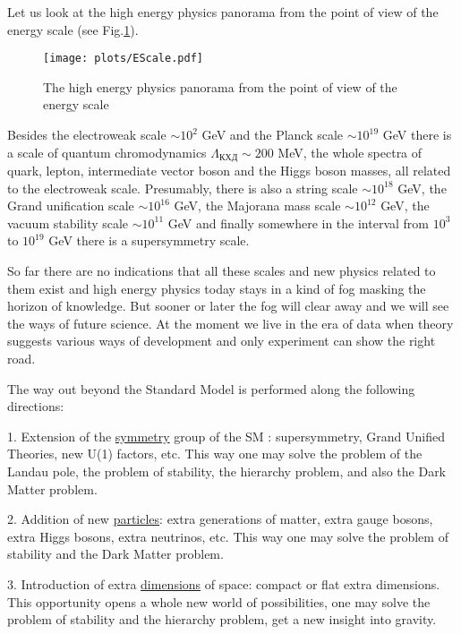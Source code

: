 \documentclass{cernyrep}
\begin{document}
Let us look at the high energy physics panorama from the point of view of the energy scale (see Fig.\ref{EScale}).
\begin{figure}[ht!]
\begin{center}\vspace{0.3cm}
\leavevmode
\texttt{[image: plots/EScale.pdf]}
\end{center}
\caption{The high energy physics panorama from the point of view of the energy scale}
\label{EScale}
\end{figure}
Besides the electroweak scale $\sim 10^2$  GeV and the Planck scale $\sim 10^{19}$  GeV there is a scale of quantum chromodynamics $\Lambda_{КХД}\sim 200$ MeV, the whole spectra of quark,  lepton, intermediate vector boson and the Higgs boson masses, all related to the electroweak scale. 
Presumably, there is also a string scale $\sim 10^{18}$ GeV, the Grand unification scale $\sim 10^{16}$ GeV, the Majorana mass scale $\sim 10^{12}$ GeV, the vacuum stability scale $\sim 10^{11}$ GeV and finally somewhere in the interval from $10^{3}$ to $10^{19}$ GeV there is a supersymmetry scale.

So far there are no indications that all these scales and new physics related to them exist and high energy physics today stays in a kind of fog masking the horizon of knowledge. But sooner or later the fog will clear away and we will see the ways of future science. At the moment we live in the era of data when theory suggests various ways of development  and only experiment can show the right road.

The way out beyond the Standard Model is performed along the following directions:

1. Extension of  the \underline{symmetry} group of the SM : supersymmetry, Grand Unified Theories, new U(1) factors, etc. This way one  may solve the problem of the Landau pole, the problem of stability, 
the hierarchy problem, and also the Dark Matter problem.

2. Addition of new   \underline{particles}:  extra generations of matter, extra gauge bosons, extra Higgs bosons, extra neutrinos, etc. This way one may solve the problem of stability and the Dark Matter problem.

3. Introduction of extra  \underline{dimensions} of space: compact or flat extra dimensions. 
 This opportunity opens a whole new world of possibilities, one may solve the problem of 
   stability and  the hierarchy problem, get a new insight into gravity.
   
\end{document}
